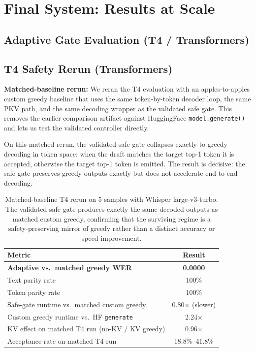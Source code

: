 \documentclass[11pt,a4paper]{article}
\begin{document}
\section{Final System: Results at Scale}
\label{sec:final}

\subsection{Adaptive Gate Evaluation (T4 / Transformers)}
\subsection{T4 Safety Rerun (Transformers)}

\noindent\textbf{Matched-baseline rerun:} We reran the T4 evaluation with an apples-to-apples custom greedy baseline that uses the same token-by-token decoder loop, the same PKV path, and the same decoding wrapper as the validated safe gate.
This removes the earlier comparison artifact against HuggingFace \texttt{model.generate()} and lets us test the validated controller directly.

On this matched rerun, the validated safe gate collapses exactly to greedy decoding in token space: when the draft matches the target top-1 token it is accepted, otherwise the target top-1 token is emitted.
The result is decisive: the safe gate preserves greedy outputs exactly but does not accelerate end-to-end decoding.

\begin{table}[H]
\centering
\small
\begin{tabular}{@{}lc@{}}
\toprule
\textbf{Metric} & \textbf{Result} \\
\midrule
\textbf{Adaptive vs.\ matched greedy WER} & \textbf{0.0000} \\
Text parity rate & 100\% \\
Token parity rate & 100\% \\
Safe-gate runtime vs.\ matched custom greedy & 0.80$\times$ (slower) \\
Custom greedy runtime vs.\ HF \texttt{generate} & 2.24$\times$ \\
KV effect on matched T4 run (no-KV / KV greedy) & 0.96$\times$ \\
Acceptance rate on matched T4 run & 18.8\%--41.8\% \\
\bottomrule
\end{tabular}
\caption{Matched-baseline T4 rerun on 5 samples with Whisper large-v3-turbo. The validated safe gate produces exactly the same decoded outputs as matched custom greedy, confirming that the surviving regime is a safety-preserving mirror of greedy rather than a distinct accuracy or speed improvement.}
\label{tab:t4_v2}
\end{table}
\end{document}

